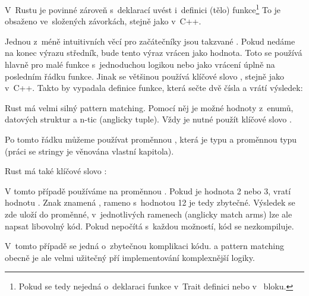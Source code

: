 \documentclass[main.tex]{subfiles}
\begin{document}
V~Rustu je povinné zároveň s~deklarací uvést i~definici (tělo) funkce\footnote{Pokud
    se tedy nejedná o~deklaraci funkce v~Trait definici nebo v~ bloku.
} To je obsaženo ve~složených závorkách, stejně jako v~C++.

Jednou z~méně intuitivních věcí pro začátečníky jsou takzvané .
Pokud nedáme na konec výrazu středník, bude tento výraz vrácen jako hodnota. Toto se
používá hlavně pro malé funkce s~jednoduchou logikou nebo jako vrácení úplně na posledním
řádku funkce. Jinak se většinou používá klíčové slovo , stejně jako v~C++.
Takto by vypadala definice funkce, která sečte dvě čísla a vrátí výsledek:

\obrazek
{}


Rust má velmi silný pattern matching. Pomocí něj je možné  hodnoty
z~enumů, datových struktur a n-tic (anglicky tuple). Vždy je nutné použít klíčové
slovo .

\obrazek
{}

Po tomto řádku můžeme používat proměnnou , která je typu  a
proměnnou  typu  (práci se stringy je věnována vlastní kapitola).

Rust má také klíčové slovo :

\obrazek
{}

V tomto případě používáme  na proměnnou . Pokud je hodnota
2 nebo 3, vratí  hodnotu . Znak \irust{_} znamená
, rameno s~hodnotou 12 je tedy zbytečné. Výsledek se zde uloží do
proměnné, v~jednotlivých ramenech (anglicky match arms) lze ale napsat libovolný kód.
Pokud  nepočítá s~každou možností, kód se nezkompiluje.

V~tomto případě se jedná o~zbytečnou komplikaci kódu.  a pattern matching
obecně je ale velmi užitečný pří implementování komplexnější logiky.

\end{document}
